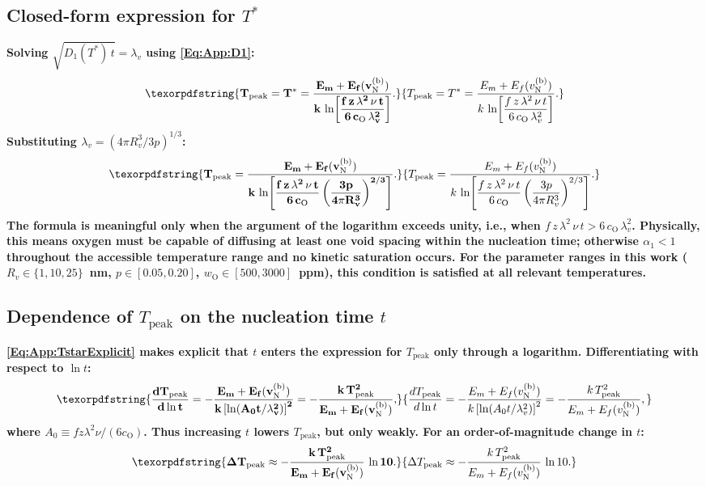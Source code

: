 \documentclass[preprint,12pt,sort&compress]{elsarticle}
\newcommand{\?}{\stackrel{?}{=}}
\providecommand{\DIFaddtex}[1]{{\bf #1}} %
\providecommand{\DIFadd}[1]{\texorpdfstring{\DIFaddtex{#1}}{#1}} %
\begin{document}
\subsection{\DIFadd{Closed-form expression for }\texorpdfstring{$T^*$}{T*}}
\label{App:Tpeak:Formula}

\DIFadd{Solving $\sqrt{D_1(T^*)\,t} = \lambda_v$ using \cref{Eq:App:D1}:
}\begin{equation}
\DIFadd{T_\text{peak} = T^* = \frac{E_m + E_f(v_\text{N}^{(\text{b})})}{k\,\ln\!\left[\dfrac{f\,z\,\lambda^2\,\nu\,t}{6\,c_\text{O}\,\lambda_v^2}\right]}.
\label{Eq:App:TstarFormula}
}\end{equation}
\DIFadd{Substituting $\lambda_v = (4\pi R_v^3 / 3p)^{1/3}$:
}\begin{equation}
\DIFadd{T_\text{peak} = \frac{E_m + E_f(v_\text{N}^{(\text{b})})}{k\,\ln\!\left[\dfrac{f\,z\,\lambda^2\,\nu\,t}{6\,c_\text{O}}\left(\dfrac{3p}{4\pi R_v^3}\right)^{2/3}\right]}.
\label{Eq:App:TstarExplicit}
}\end{equation}
\DIFadd{The formula is meaningful only when the argument of the logarithm exceeds unity, i.e., when $f\,z\,\lambda^2\,\nu\,t > 6\,c_\text{O}\,\lambda_v^2$. Physically, this means oxygen must be capable of diffusing at least one void spacing within the nucleation time; otherwise $\alpha_1 < 1$ throughout the accessible temperature range and no kinetic saturation occurs. For the parameter ranges in this work ($R_v \in \{1, 10, 25\}$~nm, $p \in [0.05, 0.20]$, $w_\text{O} \in [500, 3000]$~ppm), this condition is satisfied at all relevant temperatures.
}

\subsection{\DIFadd{Dependence of }\texorpdfstring{$T_\text{peak}$}{Tpeak} \DIFadd{on the nucleation time }\texorpdfstring{$t$}{t}}
\label{App:Tpeak:tdep}

\DIFadd{\cref{Eq:App:TstarExplicit} makes explicit that $t$ enters the expression for $T_\text{peak}$ only through a logarithm. Differentiating with respect to $\ln t$:
}\begin{equation}
\DIFadd{\frac{dT_\text{peak}}{d\ln t}
=
-\frac{E_m + E_f(v_\text{N}^{(\text{b})})}{
k\left[\ln\!\left(A_0 t / \lambda_v^2\right)\right]^2
}
=
-\frac{k\,T_\text{peak}^2}{E_m + E_f(v_\text{N}^{(\text{b})})},
\label{Eq:App:dTpeak_dlogt}
}\end{equation}
\DIFadd{where $A_0 \equiv f z \lambda^2 \nu / (6 c_\text{O})$. Thus increasing $t$ lowers $T_\text{peak}$, but only weakly. For an order-of-magnitude change in $t$:
}\begin{equation}
\DIFadd{\Delta T_\text{peak}
\approx
-\frac{k\,T_\text{peak}^2}{E_m + E_f(v_\text{N}^{(\text{b})})}\,\ln 10.
\label{Eq:App:deltaTpeak}
}\end{equation}
\end{document}
